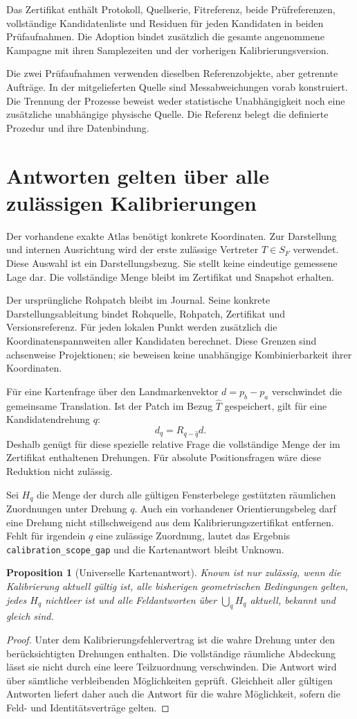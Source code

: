 \documentclass[11pt,a4paper]{article}
\newcommand{\nextsection}[2]{\clearpage{\color{accent}\small\textsf{#1}}\section{#2}}
\newtheorem{proposition}{Proposition}[section]
\begin{document}
Das Zertifikat enthält Protokoll, Quellserie, Fitreferenz,
beide Prüfreferenzen, vollständige Kandidatenliste und Residuen
für jeden Kandidaten in beiden Prüfaufnahmen. Die Adoption bindet
zusätzlich die gesamte angenommene Kampagne mit ihren Samplezeiten
und der vorherigen Kalibrierungsversion.

Die zwei Prüfaufnahmen verwenden dieselben Referenzobjekte, aber
getrennte Aufträge. In der mitgelieferten Quelle sind Messabweichungen
vorab konstruiert. Die Trennung der Prozesse beweist weder statistische
Unabhängigkeit noch eine zusätzliche unabhängige physische Quelle.
Die Referenz belegt die definierte Prozedur und ihre Datenbindung.

\nextsection{63 / MENGENWERTIGE WAHRNEHMUNG}{Antworten gelten über alle zulässigen Kalibrierungen}
Der vorhandene exakte Atlas benötigt konkrete Koordinaten. Zur
Darstellung und internen Ausrichtung wird der erste zulässige
Vertreter $\widehat T\in S_F$ verwendet. Diese Auswahl ist ein
Darstellungsbezug. Sie stellt keine eindeutige gemessene Lage dar.
Die vollständige Menge bleibt im Zertifikat und Snapshot erhalten.

Der ursprüngliche Rohpatch bleibt im Journal. Seine konkrete
Darstellungsableitung bindet Rohquelle, Rohpatch, Zertifikat und
Versionsreferenz. Für jeden lokalen Punkt werden zusätzlich die
Koordinatenspannweiten aller Kandidaten berechnet. Diese Grenzen
sind achsenweise Projektionen; sie beweisen keine unabhängige
Kombinierbarkeit ihrer Koordinaten.

Für eine Kartenfrage über den Landmarkenvektor $d=p_b-p_a$
verschwindet die gemeinsame Translation. Ist der Patch im Bezug
$\widehat T$ gespeichert, gilt für eine Kandidatendrehung $q$:
\[
 d_q=R_{q-\widehat q}d.
\]
Deshalb genügt für diese spezielle relative Frage die vollständige
Menge der im Zertifikat enthaltenen Drehungen. Für absolute
Positionsfragen wäre diese Reduktion nicht zulässig.

Sei $H_q$ die Menge der durch alle gültigen Fensterbelege gestützten
räumlichen Zuordnungen unter Drehung $q$. Auch ein vorhandener
Orientierungsbeleg darf eine Drehung nicht stillschweigend aus dem
Kalibrierungszertifikat entfernen. Fehlt für irgendein $q$ eine
zulässige Zuordnung, lautet das Ergebnis
\texttt{calibration\_scope\_gap} und die Kartenantwort bleibt Unknown.

\begin{proposition}[Universelle Kartenantwort]
Known ist nur zulässig, wenn die Kalibrierung aktuell gültig ist,
alle bisherigen geometrischen Bedingungen gelten, jedes $H_q$
nichtleer ist und alle Feldantworten über $\bigcup_qH_q$ aktuell,
bekannt und gleich sind.
\end{proposition}
\begin{proof}
Unter dem Kalibrierungsfehlervertrag ist die wahre Drehung unter den
berücksichtigten Drehungen enthalten. Die vollständige räumliche
Abdeckung lässt sie nicht durch eine leere Teilzuordnung verschwinden.
Die Antwort wird über sämtliche verbleibenden Möglichkeiten geprüft.
Gleichheit aller gültigen Antworten liefert daher auch die Antwort
für die wahre Möglichkeit, sofern die Feld- und Identitätsverträge gelten.
\end{proof}
\end{document}
